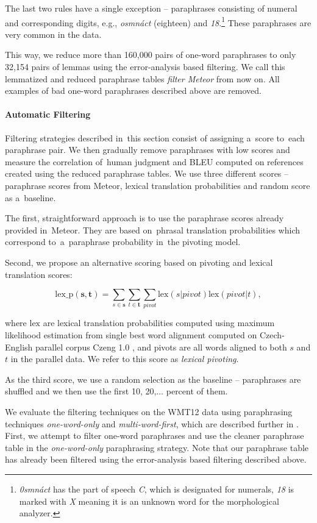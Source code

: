 The last two rules have a single exception -- paraphrases consisting of numeral and corresponding digits, e.g., \textit{osmnáct} (eighteen) and \textit{18}.\footnote{
\textit{0smnáct} has the part of speech \textit{C}, which is designated for numerals, \textit{18} is marked with \textit{X} meaning it is an unknown word for the morphological analyzer.} 
These paraphrases are very common in the data. 

This way, we reduce more than 160,000 pairs of one-word paraphrases to only 32,154 pairs of lemmas using the error-analysis based filtering. 
We call this lemmatized and reduced paraphrase tables  \emph{filter Meteor} from now on.
All examples of bad one-word paraphrases described above are removed.


\paragraph{Automatic Filtering}
Filtering strategies described in~this section consist of assigning a~score to~each paraphrase pair. 
We then gradually remove paraphrases with low scores and measure the correlation of~human judgment and BLEU computed on references created using the reduced paraphrase tables. 
We use three different scores -- paraphrase scores from Meteor, lexical translation probabilities and random score as a~baseline.

The first, straightforward approach is to use the paraphrase scores already provided in~Meteor. 
They are based on~phrasal translation probabilities which correspond to~a~paraphrase probability in~the pivoting model.

Second, we propose an alternative scoring based on pivoting and lexical translation scores:

$$\text{lex\_p}(\mathbf{s},\mathbf{t}) = \sum_{s \in \mathbf{s}}\sum_{t \in\mathbf{t}}\sum_{pivot}\text{lex}(s|pivot)\text{lex}(pivot|t),$$

where $\text{lex}$ are lexical translation probabilities computed using maximum likelihood estimation from single best word alignment computed on Czech-English parallel corpus Czeng 1.0 \citep{czeng10:lrec2012}, and pivots are all words aligned to both $s$ and $t$ in the parallel data. 
We refer to this score as \emph{lexical pivoting}.

As the third score, we use a random selection as the baseline -- paraphrases are shuffled and we then use the first 10, 20,$\ldots$ percent of them.

We evaluate the filtering techniques on the WMT12 data using paraphrasing techniques \emph{one-word-only} and  \emph{multi-word-first}, which are described further in .
First, we attempt to filter one-word paraphrases and use the cleaner paraphrase table in the \emph{one-word-only} paraphrasing strategy. 
Note that our paraphrase table has already been filtered using the error-analysis based filtering described above.

